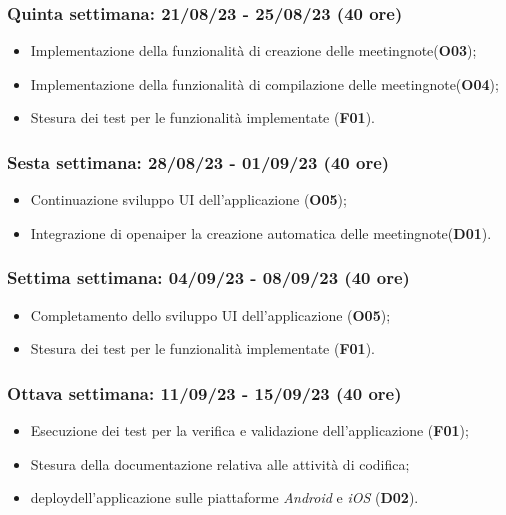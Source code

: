 \subsubsection{Quinta settimana: 21/08/23 - 25/08/23 (40 ore)}
    \begin{itemize}
        \item Implementazione della funzionalità di creazione delle \gls{meetingnote}\glsoccur (\textbf{O03});
        \item Implementazione della funzionalità di compilazione delle \gls{meetingnote}\glsoccur (\textbf{O04});
        \item Stesura dei test per le funzionalità implementate (\textbf{F01}).
    \end{itemize}
\subsubsection{Sesta settimana: 28/08/23 - 01/09/23 (40 ore)}
    \begin{itemize}
        \item Continuazione sviluppo UI dell'applicazione (\textbf{O05});
        \item Integrazione di \gls{openai}\glsoccur per la creazione automatica delle \gls{meetingnote}\glsoccur (\textbf{D01}).
    \end{itemize}
\subsubsection{Settima settimana: 04/09/23 - 08/09/23 (40 ore)}
    \begin{itemize}
        \item Completamento dello sviluppo UI dell'applicazione (\textbf{O05});
        \item Stesura dei test per le funzionalità implementate (\textbf{F01}).
    \end{itemize} 
\subsubsection{Ottava settimana: 11/09/23 - 15/09/23 (40 ore)}
    \begin{itemize}
        \item Esecuzione dei test per la verifica e validazione dell'applicazione (\textbf{F01});
        \item Stesura della documentazione relativa alle attività di codifica;
        \item \Gls{deploy}\glsoccur dell'applicazione sulle piattaforme \emph{Android} e \emph{iOS} (\textbf{D02}).
    \end{itemize}

